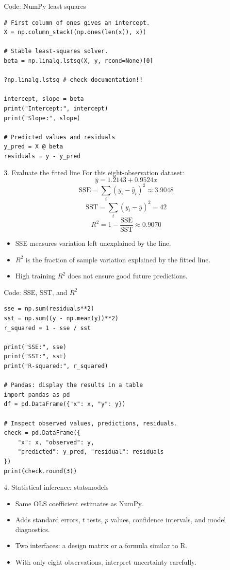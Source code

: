 \documentclass[aspectratio=43,11pt]{beamer}
\begin{document}
\begin{frame}[fragile]{Code: NumPy least squares}
\small
\color{maroon}
\begin{verbatim}
# First column of ones gives an intercept.
X = np.column_stack((np.ones(len(x)), x))

# Stable least-squares solver.
beta = np.linalg.lstsq(X, y, rcond=None)[0]

?np.linalg.lstsq # check documentation!!

intercept, slope = beta
print("Intercept:", intercept)
print("Slope:", slope)

# Predicted values and residuals
y_pred = X @ beta
residuals = y - y_pred
\end{verbatim}
\end{frame}

\begin{frame}{3. Evaluate the fitted line}
\small
For this eight-observation dataset:
\[
\boxed{\widehat y=1.2143+0.9524x}
\]
\[
\mathrm{SSE}=\sum_i(y_i-\widehat y_i)^2\approx3.9048
\]
\[
\mathrm{SST}=\sum_i(y_i-\bar y)^2=42
\]
\[
\boxed{R^2=1-\frac{\mathrm{SSE}}{\mathrm{SST}}\approx0.9070}
\]
\begin{itemize}
\item SSE measures variation left unexplained by the line.
\item $R^2$ is the fraction of sample variation explained by the fitted line.
\item High training $R^2$ does not ensure good future predictions.
\end{itemize}
\end{frame}

\begin{frame}[fragile]{Code: SSE, SST, and $R^2$}
\small
\color{maroon}
\begin{verbatim}
sse = np.sum(residuals**2)
sst = np.sum((y - np.mean(y))**2)
r_squared = 1 - sse / sst

print("SSE:", sse)
print("SST:", sst)
print("R-squared:", r_squared)

# Pandas: display the results in a table
import pandas as pd
df = pd.DataFrame({"x": x, "y": y})

# Inspect observed values, predictions, residuals.
check = pd.DataFrame({
    "x": x, "observed": y,
    "predicted": y_pred, "residual": residuals
})
print(check.round(3))
\end{verbatim}
\end{frame}

\begin{frame}{4. Statistical inference: statsmodels}
\begin{itemize}
\item Same OLS coefficient estimates as NumPy.
\item Adds standard errors, $t$ tests, $p$ values, confidence intervals, and model diagnostics.
\item Two interfaces: a design matrix or a formula similar to R.
\item With only eight observations, interpret uncertainty carefully.
\end{itemize}
\end{frame}
\end{document}

